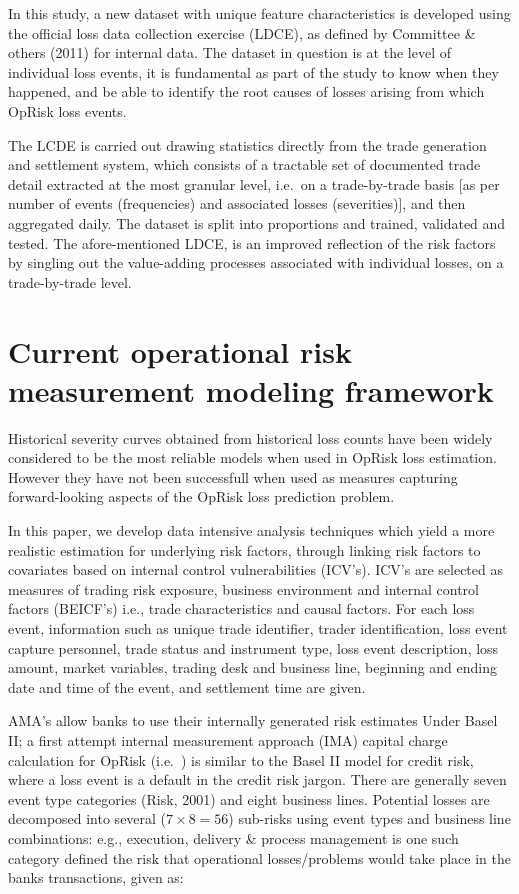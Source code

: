 \documentclass{DissertateUSU}
\begin{document}
In this study, a new dataset with unique feature characteristics is
developed using the official loss data collection exercise (LDCE), as
defined by Committee \& others (2011) for internal data. The dataset in
question is at the level of individual loss events, it is fundamental as
part of the study to know when they happened, and be able to identify
the root causes of losses arising from which OpRisk loss events.\medskip

The LCDE is carried out drawing statistics directly from the trade
generation and settlement system, which consists of a tractable set of
documented trade detail extracted at the most granular level, i.e.~on a
trade-by-trade basis {[}as per number of events (frequencies) and
associated losses (severities){]}, and then aggregated daily. The
dataset is split into proportions and trained, validated and tested. The
afore-mentioned LDCE, is an improved reflection of the risk factors by
singling out the value-adding processes associated with individual
losses, on a trade-by-trade level.

\section{Current operational risk measurement modeling framework}
\label{sec:Current operational risk measurement modeling framework}

Historical severity curves obtained from historical loss counts have
been widely considered to be the most reliable models when used in
OpRisk loss estimation. However they have not been successfull when used
as measures capturing forward-looking aspects of the OpRisk loss
prediction problem.\medskip 

In this paper, we develop data intensive analysis techniques which yield
a more realistic estimation for underlying risk factors, through linking
risk factors to covariates based on internal control vulnerabilities
(ICV's). ICV's are selected as measures of trading risk exposure,
business environment and internal control factors (BEICF's) i.e., trade
characteristics and causal factors. For each loss event, information
such as unique trade identifier, trader identification, loss event
capture personnel, trade status and instrument type, loss event
description, loss amount, market variables, trading desk and business
line, beginning and ending date and time of the event, and settlement
time are given.\medskip  

AMA's allow banks to use their internally generated risk estimates Under
Basel II; a first attempt internal measurement approach (IMA) capital
charge calculation for OpRisk (i.e.~) is similar to the Basel II model
for credit risk, where a loss event is a default in the credit risk
jargon. There are generally seven event type categories (Risk, 2001) and
eight business lines. Potential losses are decomposed into several
(\(7 \times 8 = 56\)) sub-risks using event types and business line
combinations: e.g., execution, delivery \& process management is one
such category defined the risk that operational losses/problems would
take place in the banks transactions, given as:
\end{document}
